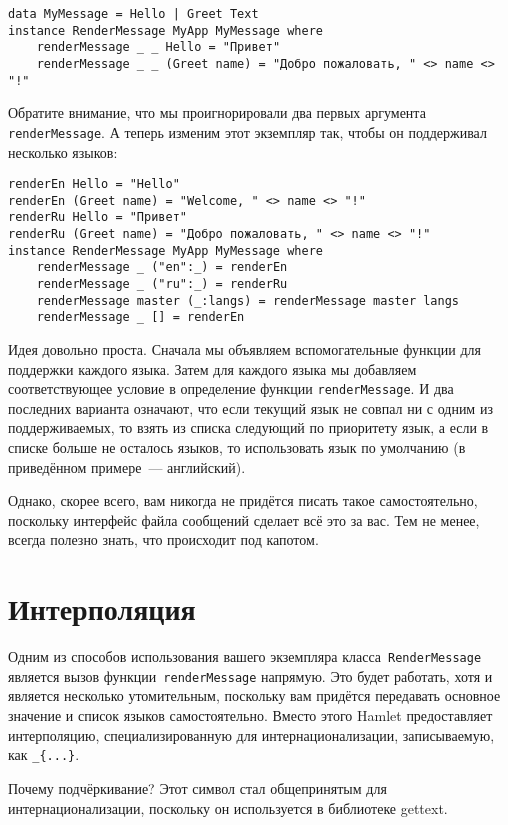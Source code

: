 \begin{lstlisting}
data MyMessage = Hello | Greet Text
instance RenderMessage MyApp MyMessage where
    renderMessage _ _ Hello = "Привет"
    renderMessage _ _ (Greet name) = "Добро пожаловать, " <> name <> "!"
\end{lstlisting}

Обратите внимание, что мы проигнорировали два первых аргумента
\lstinline'renderMessage'. А теперь изменим этот экземпляр так, чтобы он
поддерживал несколько языков:

\begin{lstlisting}
renderEn Hello = "Hello"
renderEn (Greet name) = "Welcome, " <> name <> "!"
renderRu Hello = "Привет"
renderRu (Greet name) = "Добро пожаловать, " <> name <> "!"
instance RenderMessage MyApp MyMessage where
    renderMessage _ ("en":_) = renderEn
    renderMessage _ ("ru":_) = renderRu
    renderMessage master (_:langs) = renderMessage master langs
    renderMessage _ [] = renderEn
\end{lstlisting}

Идея довольно проста. Сначала мы объявляем вспомогательные функции для
поддержки каждого языка. Затем для каждого языка мы добавляем соответствующее
условие в определение функции \lstinline'renderMessage'. И два последних
варианта означают, что если текущий язык не совпал ни с одним из
поддерживаемых, то взять из списка следующий по приоритету язык, а если в
списке больше не осталось языков, то использовать язык по умолчанию (в
приведённом примере~--- английский).

Однако, скорее всего, вам никогда не придётся писать такое самостоятельно,
поскольку интерфейс файла сообщений сделает всё это за вас. Тем не менее,
всегда полезно знать, что происходит под капотом.

\section{Интерполяция}

Одним из способов использования вашего экземпляра
класса~\lstinline'RenderMessage' является вызов
функции~\lstinline'renderMessage' напрямую. Это будет работать, хотя и является
несколько утомительным, поскольку вам придётся передавать основное значение и
список языков самостоятельно.  Вместо этого Hamlet предоставляет интерполяцию,
специализированную для интернационализации, записываемую, как
\lstinline'_{...}'.

\begin{remark}
    Почему подчёркивание? Этот символ стал общепринятым для
    интернационализации, поскольку он используется в библиотеке gettext.
\end{remark}

